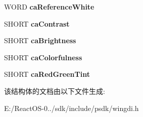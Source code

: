 \begin{DoxyCompactItemize}
W\+O\+RD {\bfseries ca\+Reference\+White}
\item 
\mbox{\label{structtag_c_o_l_o_r_a_d_j_u_s_t_m_e_n_t_a8701d9dbb6e086718956eddd2ba8f724}} 
S\+H\+O\+RT {\bfseries ca\+Contrast}
\item 
\mbox{\label{structtag_c_o_l_o_r_a_d_j_u_s_t_m_e_n_t_aae4e0e23748a805beb509efde5624767}} 
S\+H\+O\+RT {\bfseries ca\+Brightness}
\item 
\mbox{\label{structtag_c_o_l_o_r_a_d_j_u_s_t_m_e_n_t_a5621a20dd97f63f08426d3f505835ad0}} 
S\+H\+O\+RT {\bfseries ca\+Colorfulness}
\item 
\mbox{\label{structtag_c_o_l_o_r_a_d_j_u_s_t_m_e_n_t_a0b9a10080003609d5030caaef8c29885}} 
S\+H\+O\+RT {\bfseries ca\+Red\+Green\+Tint}
\end{DoxyCompactItemize}


该结构体的文档由以下文件生成\+:\begin{DoxyCompactItemize}
\item 
E\+:/\+React\+O\+S-\/0../sdk/include/psdk/wingdi.\+h\end{DoxyCompactItemize}
